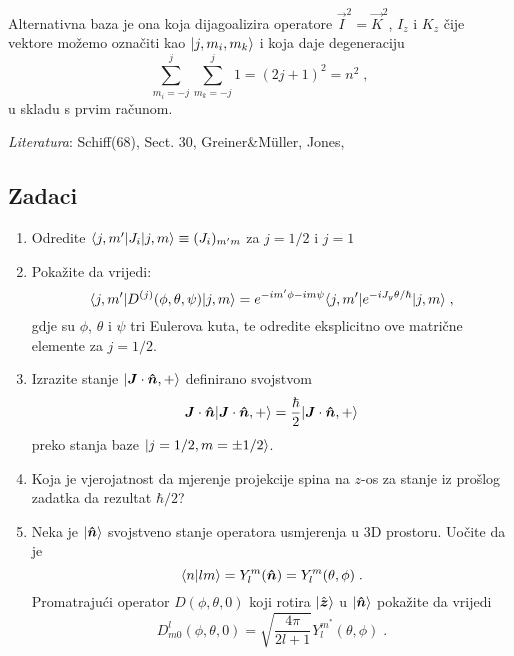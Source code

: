 Alternativna baza je ona koja dijagoalizira operatore
$\vec{I}^2=\vec{K}^2$, $I_z$ i $K_z$ čije vektore možemo
označiti kao $| j,m_i, m_k \rangle$ i koja daje degeneraciju
\begin{equation}
    \sum_{m_i=-j}^{j}\sum_{m_k=-j}^{j} 1 = (2j+1)^2 = n^2 \;,
\end{equation}
u skladu s prvim računom.

\emph{Literatura}: Schiff(68), Sect. 30, Greiner\&M\"{u}ller, Jones,

\subsection*{Zadaci}

\begin{enumerate}[label=\arabic{chapter}.\arabic*.]

\item
Odredite $\langle j, m' |J_{i} | j, m \rangle \equiv (J_i)_{m' m}$ za 
$j=1/2$ i $j=1$

\item
Pokažite da vrijedi: 
\begin{equation}
\langle j, m' | D^{(j)}(\phi, \theta, \psi) | j, m \rangle = e^{-im'\phi-im\psi}
\langle j, m' | e^{-i J_y \theta /\hbar} | j, m \rangle \;,
\end{equation}
gdje su $\phi$, $\theta$ i $\psi$ tri Eulerova kuta,
te odredite eksplicitno ove matrične elemente za $j=1/2$.

\item
Izrazite stanje $\ket{\vec{J}\cdot\unitn, +}$ definirano svojstvom
\begin{displaymath}
    \vec{J}\cdot\unitn \ket{\vec{J}\cdot\unitn, +} =
  \frac{\hbar}{2} \ket{\vec{J}\cdot\unitn, +}
\end{displaymath}
preko stanja baze $| j=1/2, m=\pm 1/2 \rangle$.

\item
Koja je vjerojatnost da mjerenje projekcije spina na $z$-os za stanje iz
prošlog zadatka da rezultat $\hbar/2$?

\item 
Neka je $\ket{\unitn}$ svojstveno stanje operatora usmjerenja u 3D
prostoru. Uočite da je
\begin{displaymath}
     \bra{n}lm\rangle = Y^{m}_l (\unitn) = Y^{m}_l (\theta, \phi) \;.
\end{displaymath}
Promatrajući operator $D(\phi,\theta,0)$ koji rotira $\ket{\hat{\vec{z}}}$
u $\ket{\unitn}$ pokažite da vrijedi
\begin{displaymath}
    D^{l}_{m0}(\phi,\theta,0)=\sqrt{\frac{4\pi}{2l+1}}
 Y^{m^*}_l (\theta, \phi)\;.
\end{displaymath}


\end{enumerate}
